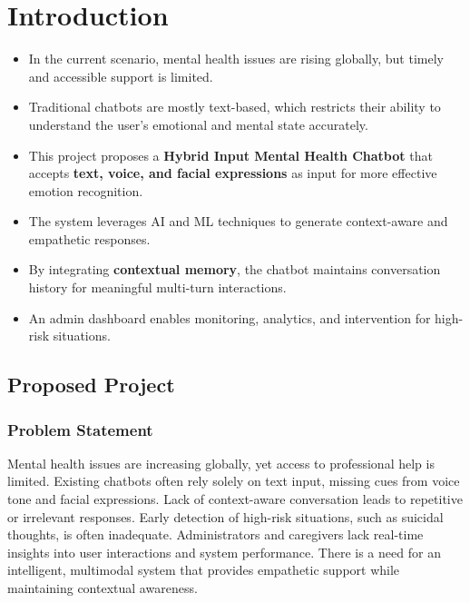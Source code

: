 \documentclass[11pt]{report}
\begin{document}
\tableofcontents

\cleardoublepage

\listoffigures

\cleardoublepage

\listoftables
 
\newpage

\chapter{Introduction}
\begin{itemize}
   \item In the current scenario, mental health issues are rising globally, but timely and accessible support is limited.
    \item Traditional chatbots are mostly text-based, which restricts their ability to understand the user's emotional and mental state accurately.
    \item This project proposes a \textbf{Hybrid Input Mental Health Chatbot} that accepts \textbf{text, voice, and facial expressions} as input for more effective emotion recognition.
    \item The system leverages AI and ML techniques to generate context-aware and empathetic responses.
    \item By integrating \textbf{contextual memory}, the chatbot maintains conversation history for meaningful multi-turn interactions.
    \item An admin dashboard enables monitoring, analytics, and intervention for high-risk situations.
\end{itemize}

\section{Proposed Project}

\subsection{Problem Statement}

Mental health issues are increasing globally, yet access to professional help is limited. Existing chatbots often rely solely on text input, missing cues from voice tone and facial expressions. Lack of context-aware conversation leads to repetitive or irrelevant responses. Early detection of high-risk situations, such as suicidal thoughts, is often inadequate. Administrators and caregivers lack real-time insights into user interactions and system performance. There is a need for an intelligent, multimodal system that provides empathetic support while maintaining contextual awareness.
\end{document}
